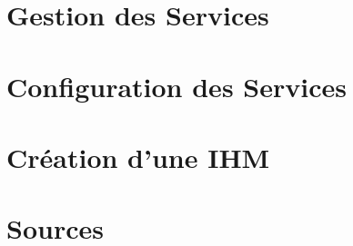 \documentclass[a4paper,11pt]{article}
\begin{document}
\section{Gestion des Services}
\label{sec:section2}

\section{Configuration des Services}
\label{sec:section3}

\section{Création d'une IHM}
\label{sec:section4}

\section{Sources}
\label{sec:section5}
\end{document}
